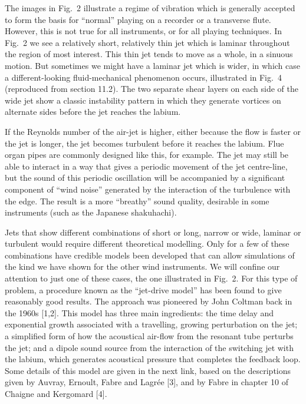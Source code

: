   The images in Fig.\ 2 illustrate a regime of vibration which is generally 
  accepted to form the basis for “normal” playing on a recorder or a transverse 
  flute. However, this is not true for all instruments, or for all playing 
  techniques. In Fig.\ 2 we see a relatively short, relatively thin jet which 
  is laminar throughout the region of most interest. This thin jet tends to 
  move as a whole, in a sinuous motion. But sometimes we might have a laminar 
  jet which is wider, in which case a different-looking fluid-mechanical 
  phenomenon occurs, illustrated in Fig.\ 4 (reproduced from section 11.2). The 
  two separate shear layers on each side of the wide jet show a classic 
  instability pattern in which they generate vortices on alternate sides before 
  the jet reaches the labium. 


  If the Reynolds number of the air-jet is higher, either because the flow is 
  faster or the jet is longer, the jet becomes turbulent before it reaches the 
  labium. Flue organ pipes are commonly designed like this, for example. The 
  jet may still be able to interact in a way that gives a periodic movement of 
  the jet centre-line, but the sound of this periodic oscillation will be 
  accompanied by a significant component of “wind noise” generated by the 
  interaction of the turbulence with the edge. The result is a more “breathy” 
  sound quality, desirable in some instruments (such as the Japanese 
  shakuhachi). 

  Jets that show different combinations of short or long, narrow or wide, 
  laminar or turbulent would require different theoretical modelling. Only for 
  a few of these combinations have credible models been developed that can 
  allow simulations of the kind we have shown for the other wind instruments. 
  We will confine our attention to just one of these cases, the one illustrated 
  in Fig.\ 2. For this type of problem, a procedure known as the “jet-drive 
  model” has been found to give reasonably good results. The approach was 
  pioneered by John Coltman back in the 1960s [1,2]. This model has three main 
  ingredients: the time delay and exponential growth associated with a 
  travelling, growing perturbation on the jet; a simplified form of how the 
  acoustical air-flow from the resonant tube perturbs the jet; and a dipole 
  sound source from the interaction of the switching jet with the labium, which 
  generates acoustical pressure that completes the feedback loop. Some details 
  of this model are given in the next link, based on the descriptions given by 
  Auvray, Ernoult, Fabre and Lagrée [3], and by Fabre in chapter 10 of Chaigne 
  and Kergomard [4]. 

